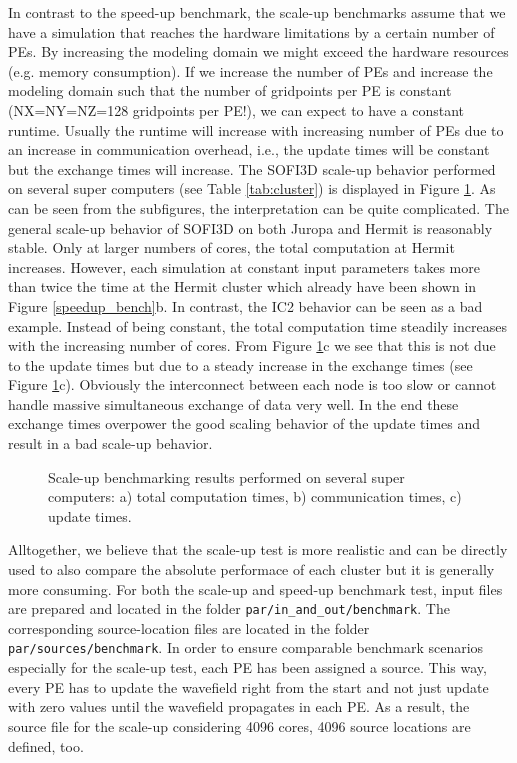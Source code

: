 \documentclass[11pt,onecolumn,oneside]{article}
\begin{document}
In contrast to the speed-up benchmark, the scale-up benchmarks assume that we have a simulation that reaches the hardware limitations by a certain number of PEs. By increasing the modeling domain we might exceed the hardware resources (e.g. memory consumption). If we increase the number of PEs and increase the modeling domain such that the number of gridpoints per PE is constant (NX=NY=NZ=128 gridpoints per PE!), we can expect to have a constant runtime. Usually the runtime will increase with increasing number of PEs due to an increase in communication overhead, i.e., the update times will be constant but the exchange times will increase. The SOFI3D scale-up behavior performed on several super computers (see Table \ref{tab:cluster}) is displayed in Figure \ref{scaleup_bench}. As can be seen from the subfigures, the interpretation can be quite complicated. The general scale-up behavior of SOFI3D on both Juropa and Hermit is reasonably stable. Only at larger numbers of cores, the total computation at Hermit increases. However, each simulation at constant input parameters takes more than twice the time at the Hermit cluster which already have been shown in Figure \ref{speedup_bench}b. In contrast, the IC2 behavior can be seen as a bad example. Instead of being constant, the total computation time steadily increases with the increasing number of cores. From Figure \ref{scaleup_bench}c we see that this is not due to the update times but due to a steady increase in the exchange times (see Figure \ref{scaleup_bench}c). Obviously the interconnect between each node is too slow or cannot handle massive simultaneous exchange of data very well. In the end these exchange times overpower the good scaling behavior of the update times and result in a bad scale-up behavior.

\begin{figure}[ht]
\begin{center}
\caption{\label{scaleup_bench} Scale-up benchmarking results performed on several super computers: a) total computation times, b) communication times, c) update times.}
\end{center}
\end{figure}

Alltogether, we believe that the scale-up test is more realistic and can be directly used to also compare the absolute performace of each cluster but it is generally more consuming. For both the scale-up and speed-up benchmark test, input files are prepared and located in the folder  \lstinline{par/in_and_out/benchmark}. The corresponding source-location files are located in the folder  \lstinline{par/sources/benchmark}. In order to ensure comparable benchmark scenarios especially for the scale-up test, each PE has been assigned a source. This way, every PE has to update the wavefield right from the start and not just update with zero values until the wavefield propagates in each PE. As a result, the source file for the scale-up considering 4096 cores, 4096 source locations are defined, too. 
\end{document}
